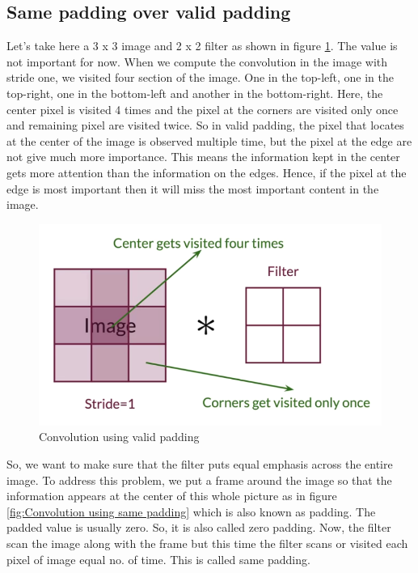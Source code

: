             \subsection{Same padding over valid padding}
                Let's take here a 3 x 3 image and 2 x 2 filter as shown in figure \ref{fig:Convolution using valid padding}. The value is not important for now. When we compute the convolution in the image with stride one, we visited four section of the image. One in the top-left, one in the top-right, one in the bottom-left and another in the bottom-right. Here, the center pixel is visited 4 times and the pixel at the corners are visited only once and remaining pixel are visited twice. So in valid padding, the pixel that locates at the center of the image is observed multiple time, but the pixel at the edge are not give much more importance. This means the information kept in the center gets more attention than the information on the edges. Hence, if the pixel at the edge is most important then it will miss the most important content in the image.
                \begin{figure}[h]                 
                    \centering                 
                    \includegraphics[width=.9\textwidth]{img/experiment/validpad.png}                 
                    \caption{Convolution using valid padding}                 
                    \label{fig:Convolution using valid padding}         
                \end{figure}
                So, we want to make sure that the filter puts equal emphasis across the entire image. To address this problem, we put a frame around the image so that the information appears at the center of this whole picture as in figure \ref{fig:Convolution using same padding} which is also known as padding. The padded value is usually zero. So, it is also called zero padding. Now, the filter scan the image along with the frame but this time the filter scans or visited each pixel of image equal no. of time. This is called same padding.
